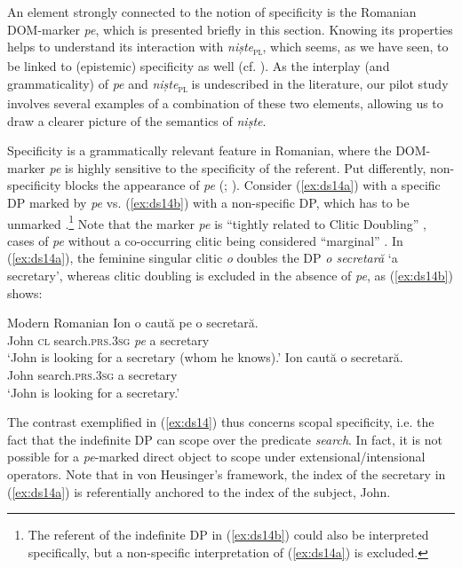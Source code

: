 \documentclass[output=paper,colorlinks,citecolor=brown]{langscibook}
\begin{document}
An element strongly connected to the notion of specificity is the Romanian DOM-marker \textit{pe}, which is presented briefly in this section. Knowing its properties helps to understand its interaction with \textit{niște}\textsubscript{\textsc{pl}}, which seems, as we have seen, to be linked to (epistemic) specificity as well (cf. ). As the interplay (and grammaticality) of \textit{pe} and \textit{niște}\textsubscript{\textsc{pl}} is undescribed in the literature, our pilot study involves several examples of a combination of these two elements, allowing us to draw a clearer picture of the semantics of \textit{niște}.

Specificity is a grammatically relevant feature in Romanian, where the DOM-marker \textit{pe} is highly sensitive to the specificity of the referent. Put differently, non-specificity blocks the appearance of \textit{pe} (\cite[303]{ChiriacescuHeusinger2010}; \cite[42]{Stark2011}). Consider (\ref{ex:ds14a}) with a specific DP marked by \textit{pe} vs. (\ref{ex:ds14b}) with a non-specific DP, which has to be unmarked \citep[examples taken from][303--304]{ChiriacescuHeusinger2009}.\footnote{The referent of the indefinite DP in (\ref{ex:ds14b}) could also be interpreted specifically, but a non-specific interpretation of (\ref{ex:ds14a}) is excluded.} Note that the marker \textit{pe} is “tightly related to Clitic Doubling” \citep[393]{HillMardale2017}, cases of \textit{pe} without a co-occurring clitic being considered “marginal” \citep[7]{ChiriacescuHeusinger2009}. In (\ref{ex:ds14a}), the feminine singular clitic \textit{o} doubles the DP \textit{o secretar\u{a}} ‘a secretary’, whereas clitic doubling is excluded in the absence of \textit{pe}, as (\ref{ex:ds14b}) shows: \newpage

\ea\label{ex:ds14} Modern Romanian
    \ea\label{ex:ds14a}
    \gll Ion   o   caut\u{a}          pe o secretar\u{a}.\\
       John \textsc{cl} search.\textsc{prs.3sg} \textit{pe} a  secretary\\
    \glt ‘John is looking for a secretary (whom he knows).’
    \ex\label{ex:ds14b}
    \gll Ion   caut\u{a}             o secretar\u{a}.\\
       John search.\textsc{prs.3sg} a  secretary\\
    \glt ‘John is looking for a secretary.’
    \z
\z

The contrast exemplified in (\ref{ex:ds14}) thus concerns scopal specificity, i.e. the fact that the indefinite DP can scope over the predicate \textit{search}. In fact, it is not possible for a \textit{pe}-marked direct object to scope under extensional/intensional operators. Note that in von Heusinger’s framework, the index of the secretary in (\ref{ex:ds14a}) is referentially anchored to the index of the subject, John.
\end{document}
